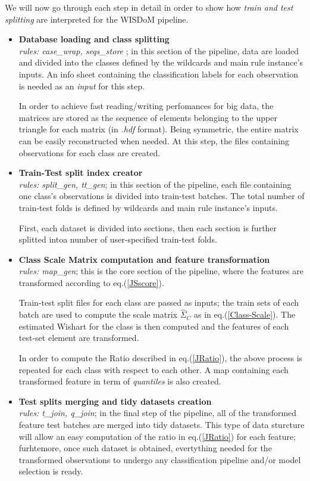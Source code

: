\documentclass[12pt,openright,twoside,a4paper]{book}
\begin{document}
We will now go through each step in detail in order to show how \textit{train and test splitting} are interpreted for the WISDoM pipeline.

\begin{itemize}
\item \textbf{Database loading and class splitting}\\
\textit{rules: case\_wrap, seqs\_store} ; in this section of the pipeline, data are loaded and divided into the classes defined by the wildcards and main rule instance's inputs. An info sheet containing the classification labels for each observation is needed as an \textit{input} for this step. 

In order to achieve fast reading/writing perfomances for big data, the matrices are stored as the sequence of elements belonging to the upper triangle for each matrix (in \textit{.hdf} format). Being symmetric, the entire matrix can be easily reconstructed when needed. At this step, the files containing observations for each class are created.

\item \textbf{Train-Test split index creator}\\
\textit{rules: split\_gen, tt\_gen}; in this section of the pipeline, each file containing one class's observations is divided into train-test batches. The total number of train-test folds is defined by wildcards and main rule instance's inputs. 

First, each dataset is divided into sections, then each section is further splitted intoa number of user-specified  train-test folds.

\item \textbf{Class Scale Matrix computation and feature transformation}\\
\textit{rules: map\_gen}; this is the core section of the pipeline, where the features are transformed according to eq.(\ref{JSscore}).

Train-test split files for each class are passed as inputs; the train sets of each batch are used to compute the scale matrix $\hat{\Sigma}_C$ as in eq.(\ref{Class-Scale}). The estimated Wishart for the class is then computed and the features of each test-set element are transformed.

In order to compute the Ratio described in eq.(\ref{JRatio}), the above process is repeated for each class with respect to each other. A map containing each transformed feature in term of \textit{quantiles} is also created.

\item \textbf{Test splits merging and tidy datasets creation}\\
\textit{rules: t\_join, q\_join}; in the final step of the pipeline, all of the transformed feature test batches are merged into tidy datasets. This type of data sturcture will allow an easy computation of the ratio in eq.(\ref{JRatio}) for each feature; furhtemore, once such dataset is obtained, evertything needed for the transformed observations to undergo any classification pipeline and/or model selection is ready.
\end{itemize}
\end{document}
